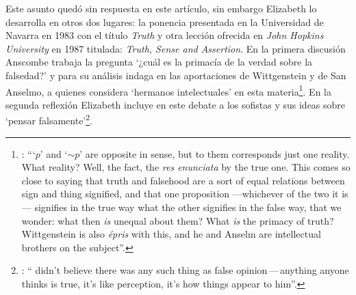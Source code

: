 Este asunto quedó sin respuesta en este artículo, sin embargo Elizabeth lo desarrolla en otros dos lugares: la ponencia presentada en la Universidad de Navarra en 1983 con el título \emph{Truth} y otra lección ofrecida en \emph{John Hopkins University} en 1987 titulada: \emph{Truth, Sense and Assertion}. En la primera discusión Anscombe trabaja la pregunta \enquote*{¿cuál es la primacía de la verdad sobre la falsedad?} y para su análisis indaga en las aportaciones de Wittgenstein y de San Anselmo, a quienes considera `hermanos intelectuales' en esta materia\footnote{\cite[Cf.][73]{anscombe2011plato:truth}: \enquote{`$p$' and `${\sim}p$' are opposite in sense, but to them corresponds just one reality. What reality? Well, the fact, the \emph{res enunciata} by the true one. This comes so close to saying that truth and falsehood are a sort of equal relations between sign and thing signified, and that one proposition ---whichever of the two it is--- signifies in the true way what the other signifies in the false way, that we wonder: what then \emph{is} unequal about them? What \emph{is} the primacy of truth? Wittgenstein is also \emph{épris} with this, and he and Anselm are intellectual brothers on the subject}.}. En la segunda reflexión Elizabeth incluye en este debate a los sofistas y sus ideas sobre `pensar falsamente'\footnote{\cite[264]{anscombe2015logic:tsa}: \enquote{ didn't believe there was any such thing as false opinion\,---\,anything anyone thinks is true, it's like perception, it's how things appear to him}.}.

